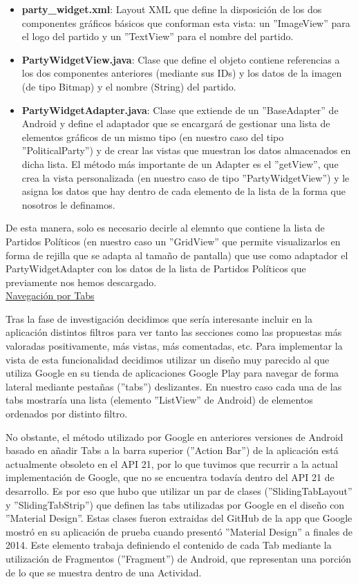 		\begin{itemize}
			\item \textbf{party\_widget.xml}: Layout XML que define la disposición de los dos componentes gráficos básicos que conforman esta vista: un ''ImageView'' para el logo del partido y un ''TextView'' para el nombre del partido.
			\item \textbf{PartyWidgetView.java}: Clase que define el objeto contiene referencias a los dos componentes anteriores (mediante sus IDs) y los datos de la imagen (de tipo Bitmap) y el nombre (String) del partido.
			\item \textbf{PartyWidgetAdapter.java}: Clase que extiende de un ''BaseAdapter'' de Android y define el adaptador que se encargará de gestionar una lista de elementos gráficos de un mismo tipo (en nuestro caso del tipo ''PoliticalParty'') y de crear las vistas que muestran los datos almacenados en dicha lista. El método más importante de un Adapter es el ''getView'', que crea la vista personalizada (en nuestro caso de tipo ''PartyWidgetView'') y le asigna los datos que hay dentro de cada elemento de la lista de la forma que nosotros le definamos. 
		\end{itemize}
		
		De esta manera, solo es necesario decirle al elemnto que contiene la lista de Partidos Políticos (en nuestro caso un ''GridView'' que permite visualizarlos en forma de rejilla que se adapta al tamaño de pantalla) que use como adaptador el PartyWidgetAdapter con los datos de la lista de Partidos Políticos que previamente nos hemos descargado. \\
		
				
		\underline{Navegación por Tabs}
		
		Tras la fase de investigación decidimos que sería interesante incluir en la aplicación distintos filtros para ver tanto las secciones como las propuestas más valoradas positivamente, más vistas, más comentadas, etc. Para implementar la vista de esta funcionalidad decidimos utilizar un diseño muy parecido al que utiliza Google en su tienda de aplicaciones Google Play para navegar de forma lateral mediante pestañas (''tabs'') deslizantes. En nuestro caso cada una de las tabs mostraría una lista (elemento ''ListView'' de Android) de elementos ordenados por distinto filtro.
		
		No obstante, el método utilizado por Google en anteriores versiones de Android basado en añadir Tabs a la barra superior (''Action Bar'')\cite{ref:android_actionBar} de la aplicación está actualmente obsoleto en el API 21, por lo que tuvimos que recurrir a la actual implementación de Google, que no se encuentra todavía dentro del API 21 de desarrollo. Es por eso que hubo que utilizar un par de clases (''SlidingTabLayout'' y ''SlidingTabStrip'') que definen las tabs utilizadas por Google en el diseño con ''Material Design''. Estas clases fueron extraidas del GitHub\cite{ref:android_tabGoogle} de la app que Google mostró en su aplicación de prueba cuando presentó ''Material Design'' a finales de 2014. Este elemento trabaja definiendo el contenido de cada Tab mediante la utilización de Fragmentos\cite{ref:android_fragment} (''Fragment'') de Android, que representan una porción de lo que se muestra dentro de una Actividad.
		
